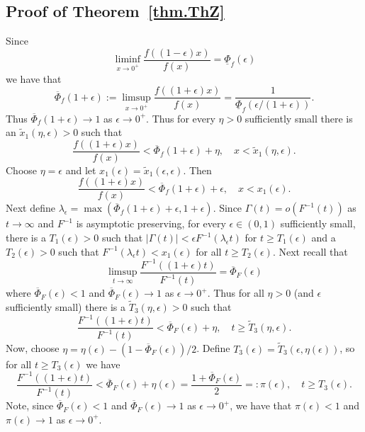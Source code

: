 \documentclass[a4paper,10pt,reqno]{amsart}
\numberwithin{equation}{section}
\theoremstyle{definition}
\theoremstyle{remark}
\DeclareMathOperator{\1}{\mathbbm 1}
\begin{document}
	\subsection{Proof of Theorem~\ref{thm.ThZ}} 
	Since 
	\[
	\liminf_{x\to 0^+} \frac{f((1-\epsilon)x)}{f(x)}=\underline{\Phi}_f(\epsilon)
	\]
	we have that 
	\[
	\overline{\Phi}_f(1+\epsilon):=\limsup_{x\to 0^+} \frac{f((1+\epsilon)x)}{f(x)}
	=\frac{1}{\underline{\Phi}_f(\epsilon/(1+\epsilon))}.
	\]
	Thus 
	$\overline{\Phi}_f(1+\epsilon)\to 1$ 
	as $\epsilon\to 0^+$. Thus for every $\eta>0$ sufficiently small there is an $\tilde{x}_1(\eta, \epsilon)>0$ such that 
	\[
	\frac{f((1+\epsilon)x)}{f(x)} < 	\overline{\Phi}_f(1+\epsilon)+\eta, \quad x<\tilde{x}_1(\eta, \epsilon).
	\]
	Choose $\eta=\epsilon$ and let $x_1(\epsilon)=\tilde{x}_1(\epsilon,\epsilon)$. Then 
	\begin{equation} \label{eq.fdd}
		\frac{f((1+\epsilon)x)}{f(x)} < 	\overline{\Phi}_f(1+\epsilon)+\epsilon, \quad x<x_1( \epsilon).
	\end{equation}	
	Next define $\lambda_\epsilon=\max(\overline{\Phi}_f(1+\epsilon)+\epsilon,1+\epsilon)$. Since $\Gamma(t)=o(F^{-1}(t))$ as $t\to\infty$ and $F^{-1}$ is asymptotic preserving, for every $\epsilon\in (0,1)$ sufficiently small, there is a $T_1(\epsilon)>0$ such that $|\Gamma(t)|<\epsilon F^{-1}(\lambda_\epsilon t)$ for $t\geq T_1(\epsilon)$ and a $T_2(\epsilon)>0$ such that $F^{-1}(\lambda_\epsilon t)<x_1(\epsilon)$ for all $t\geq T_2(\epsilon)$. Next recall that 
	\[
	\limsup_{t\to\infty} \frac{F^{-1}((1+\epsilon)t)}{F^{-1}(t)}
	=\overline{\Phi}_F(\epsilon)
	\] 
	where $\overline{\Phi}_F(\epsilon)<1$ and $\overline{\Phi}_F(\epsilon)\to 1$ as $\epsilon\to 0^+$. Thus for all $\eta>0$ (and $\epsilon$ sufficiently small) there is a $\tilde{T}_3(\eta,\epsilon)>0$ such that 
	\[
	\frac{F^{-1}((1+\epsilon)t)}{F^{-1}(t)}
	<\overline{\Phi}_F(\epsilon)+\eta, \quad t\geq \tilde{T}_3(\eta,\epsilon).
	\] 
	Now, choose $\eta=\eta(\epsilon)-(1-\overline{\Phi}_F(\epsilon))/2$. Define $T_3(\epsilon)=\tilde{T}_3(\epsilon,\eta(\epsilon))$, so for all $t\geq T_3(\epsilon)$ we have
	\begin{equation} \label{eq.Finvdot}
		\frac{F^{-1}((1+\epsilon)t)}{F^{-1}(t)}
		<\overline{\Phi}_F(\epsilon)+\eta(\epsilon)=\frac{1+\overline{\Phi}_F(\epsilon)}{2}=:\pi(\epsilon), \quad t\geq T_3(\epsilon).
	\end{equation}	 
	Note, since $\overline{\Phi}_F(\epsilon)<1$ and $\overline{\Phi}_F(\epsilon)\to 1$ as $\epsilon\to 0^+$, we have that $\pi(\epsilon)<1$ and $\pi(\epsilon)\to 1$ as $\epsilon\to 0^+$. 
	
\end{document}
